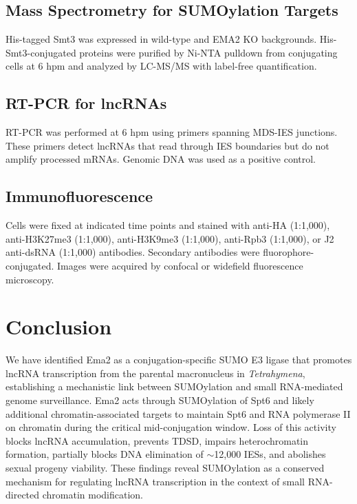 \documentclass[11pt]{article}
\begin{document}
\subsection{Mass Spectrometry for SUMOylation Targets}

His-tagged Smt3 was expressed in wild-type and EMA2 KO backgrounds. His-Smt3-conjugated proteins were purified by Ni-NTA pulldown from conjugating cells at 6 hpm and analyzed by LC-MS/MS with label-free quantification.

\subsection{RT-PCR for lncRNAs}

RT-PCR was performed at 6 hpm using primers spanning MDS-IES junctions. These primers detect lncRNAs that read through IES boundaries but do not amplify processed mRNAs. Genomic DNA was used as a positive control.

\subsection{Immunofluorescence}

Cells were fixed at indicated time points and stained with anti-HA (1:1,000), anti-H3K27me3 (1:1,000), anti-H3K9me3 (1:1,000), anti-Rpb3 (1:1,000), or J2 anti-dsRNA (1:1,000) antibodies. Secondary antibodies were fluorophore-conjugated. Images were acquired by confocal or widefield fluorescence microscopy.

\section{Conclusion}

We have identified Ema2 as a conjugation-specific SUMO E3 ligase that promotes lncRNA transcription from the parental macronucleus in \textit{Tetrahymena}, establishing a mechanistic link between SUMOylation and small RNA-mediated genome surveillance. Ema2 acts through SUMOylation of Spt6 and likely additional chromatin-associated targets to maintain Spt6 and RNA polymerase II on chromatin during the critical mid-conjugation window. Loss of this activity blocks lncRNA accumulation, prevents TDSD, impairs heterochromatin formation, partially blocks DNA elimination of $\sim$12,000 IESs, and abolishes sexual progeny viability. These findings reveal SUMOylation as a conserved mechanism for regulating lncRNA transcription in the context of small RNA-directed chromatin modification.



\end{document}
